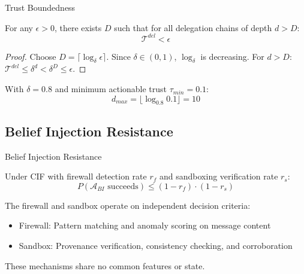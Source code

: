\documentclass[
  ignorenonframetext,
]{beamer}
\begin{document}
\begin{frame}[allowframebreaks]{Trust Boundedness}
\begin{corollary}
\label{cor:trust-vanishing}
For any $\epsilon > 0$, there exists $D$ such that for all delegation chains of depth $d > D$:
\begin{equation}
\label{eq:trust-vanishing}
\mathcal{T}^{del} < \epsilon
\end{equation}
\end{corollary}

\begin{proof}
Choose $D = \lceil \log_\delta \epsilon \rceil$. Since $\delta \in (0,1)$, $\log_\delta$ is decreasing. For $d > D$: $\mathcal{T}^{del} \leq \delta^d < \delta^D \leq \epsilon$.
\end{proof}

\begin{corollary}
\label{cor:practical-depth}
With $\delta = 0.8$ and minimum actionable trust $\tau_{min} = 0.1$:
\begin{equation}
\label{eq:practical-depth}
d_{max} = \lfloor \log_{0.8} 0.1 \rfloor = 10
\end{equation}
\end{corollary}
\end{frame}

\begin{frame}
\end{frame}

\subsection{Belief Injection Resistance}\label{sec:thm57-proof}

\begin{frame}[allowframebreaks]{Belief Injection Resistance}
\begin{theorem}
\label{thm:belief-injection-restated}
Under CIF with firewall detection rate $r_f$ and sandboxing verification rate $r_s$:
\begin{equation}
\label{eq:belief-injection-restated}
P(\mathcal{A}_{BI} \text{ succeeds}) \leq (1 - r_f) \cdot (1 - r_s)
\end{equation}
\end{theorem}

\begin{lemma}
\label{lem:defense-independence}
The firewall and sandbox operate on independent decision criteria:
\begin{itemize}
\item Firewall: Pattern matching and anomaly scoring on message content
\item Sandbox: Provenance verification, consistency checking, and corroboration
\end{itemize}
These mechanisms share no common features or state.
\end{lemma}

\end{frame}
\end{document}
